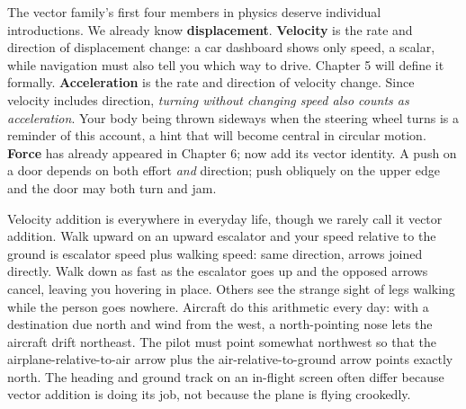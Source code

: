 \begin{center}
\end{center}

The vector family's first four members in physics deserve individual introductions. We already know \textbf{displacement}. \textbf{Velocity} is the rate and direction of displacement change: a car dashboard shows only speed, a scalar, while navigation must also tell you which way to drive. Chapter 5 will define it formally. \textbf{Acceleration} is the rate and direction of velocity change. Since velocity includes direction, \emph{turning without changing speed also counts as acceleration}. Your body being thrown sideways when the steering wheel turns is a reminder of this account, a hint that will become central in circular motion. \textbf{Force} has already appeared in Chapter 6; now add its vector identity. A push on a door depends on both effort \emph{and} direction; push obliquely on the upper edge and the door may both turn and jam.

Velocity addition is everywhere in everyday life, though we rarely call it vector addition. Walk upward on an upward escalator and your speed relative to the ground is escalator speed plus walking speed: same direction, arrows joined directly. Walk down as fast as the escalator goes up and the opposed arrows cancel, leaving you hovering in place. Others see the strange sight of legs walking while the person goes nowhere. Aircraft do this arithmetic every day: with a destination due north and wind from the west, a north-pointing nose lets the aircraft drift northeast. The pilot must point somewhat northwest so that the airplane-relative-to-air arrow plus the air-relative-to-ground arrow points exactly north. The heading and ground track on an in-flight screen often differ because vector addition is doing its job, not because the plane is flying crookedly.

